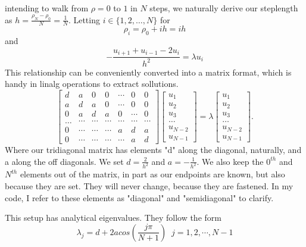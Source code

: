 \documentclass[10pt, twocolumn]{article}
\begin{document}
intending to walk from $\rho = 0$ to $1$ in $N$ steps, we naturally derive our steplength as 
$h = \frac{\rho_N - \rho_0}{N} = \frac{1}{N}$. Letting $i \in \{ 1, 2, \ldots, N\}$ for 
\[\rho_i = \rho_0 + ih = ih\] and
\[ -\frac{u_{i+1} + u_{i-1} - 2u_{i}}{h^2} = \lambda u_i\]
This relationship can be conveniently converted into a matrix format, which is handy in linalg 
operations to extract sollutions. 
\begin{equation}
    \begin{bmatrix} d& a & 0   & 0    & \cdots  &0     & 0 \\
                                a & d & a & 0    & \cdots  &0     &0 \\
                                0   & a & d & a  &0       &\cdots & 0\\
                                \dots  & \cdots & \cdots & \cdots  &\cdots      &\cdots & \cdots\\
                                0   & \cdots & \cdots & \cdots  &a  &d & a\\
                                0   & \cdots & \cdots & \cdots  &\cdots       &a & d\end{bmatrix} 
                                 \begin{bmatrix} u_1 \\ u_2 \\ u_3 \\ \dots \\ u_{N-2} \\ u_{N-1}\end{bmatrix} 
                                     = \lambda \begin{bmatrix} u_1 \\ u_2 \\ u_3 \\ \dots \\ u_{N-2} \\ u_{N-1}\end{bmatrix} . 
\label{eq:matrixse} 
\end{equation}
Where our tridiagonal matrix has elements "d" along the diagonal, naturally, and a along the 
off diagonals. We set $d = \frac{2}{h^2}$ and $a = -\frac{1}{h^2}$. We also keep the $0^{th}$ 
and $N^{th}$ elements out of the matrix, in part as our endpoints are known, but also because 
they are set. They will never change, because they are fastened. In my code, I refer to these 
elements as "diagonal" and "semidiagonal" to clarify. 

This setup has analytical eigenvalues. They follow the form
\[ \lambda_j = d + 2acos(\frac{j\pi}{N+1}) \;\; j = 1, 2, \cdots, N-1 \]\\
\end{document}
